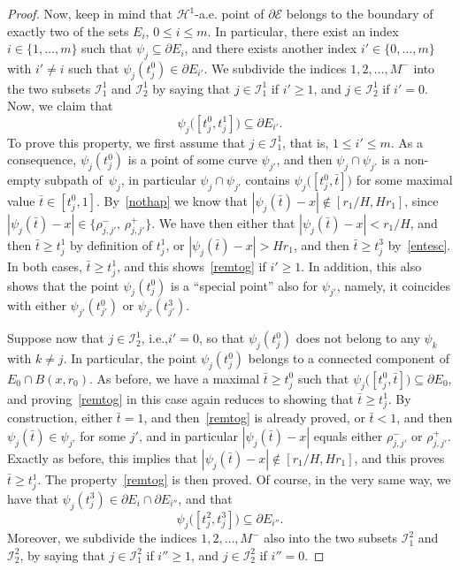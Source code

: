 \documentclass[11pt]{article}
\newcommand{\ie}{i.e.,\xspace}
\numberwithin{equation}{section}
\newcommand\E{\mathcal{E}}
\renewcommand\H{\mathcal{H}}
\newcommand\I{\mathcal{I}}
\theoremstyle{plain}
\theoremstyle{definition}
\begin{document}
\begin{proof}
Now, keep in mind that $\H^1$-a.e. point of $\partial\E$ belongs to the boundary of exactly two of the sets $E_i$, $0\leq i \leq m$. In particular, there exist an index $i\in\{1,\dots,m\}$ such that $\psi_j\subseteq \partial E_i$, and there exists another index $i'\in\{0,\dots,m\}$ with $i'\neq i$ such that $\psi_j(t^0_j)\in \partial E_{i'}$. We subdivide the indices $1,2,\dots, M^-$ into the two subsets $\I^1_1$ and $\I^1_2$ by saying that $j\in \I^1_1$ if $i'\geq 1$, and $j\in \I^1_2$ if $i'=0$. Now, we claim that
\begin{equation}\label{remtog}
\psi_j\big( [t^0_j , t^1_j]\big) \subseteq \partial E_{i'}.
\end{equation}
To prove this property, we first assume that $j\in\I^1_1$, that is, $1\leq i' \leq m$. As a con\-se\-quence, $\psi_j(t^0_j)$ is a point of some curve $\psi_{j'}$, and then $\psi_j \cap \psi_{j'}$ is a non-empty subpath of~$\psi_j$, in particular $\psi_j\cap\psi_{j'}$ contains $\psi_j\big( [t^0_j,\bar t] \big)$ for some maximal value $\bar t\in[t^0_j,1]$. By~\eqref{nothap} we know that $|\psi_j(\bar t)-x|\notin [r_1/H,Hr_1]$, since $|\psi_j(\bar t)-x| \in \{\rho^-_{j,j'},\,\rho^+_{j,j'}\}$. We have then either that $|\psi_j(\bar t)-x|<r_1/H$, and then $\bar t\geq t^1_j$ by definition of $t^1_j$, or $|\psi_j(\bar t)-x|>Hr_1$, and then $\bar t\geq t^3_j$ by~\eqref{entesc}. In both cases, $\bar t\geq t^1_j$, and this shows~\eqref{remtog} if $i'\geq 1$. In addition, this also shows that the point $\psi_j(t^0_j)$ is a ``special point'' also for $\psi_{j'}$, namely, it coincides with either $\psi_{j'}(t^0_{j'})$ or $\psi_{j'}(t^3_{j'})$.

Suppose now that $j\in \I^1_2$, \ie $i'=0$, so that $\psi_j(t^0_j)$ does not belong to any $\psi_k$ with $k\neq j$. In particular, the point $\psi_j(t^0_j)$ belongs to a connected component of $E_0\cap B(x,r_0)$. As before, we have a maximal $\bar t\geq t^0_j$ such that $\psi_j\big([t^0_j,\bar t]\big)\subseteq \partial E_0$, and proving~\eqref{remtog} in this case again reduces to showing that $\bar t\geq t^1_j$. By construction, either $\bar t=1$, and then~\eqref{remtog} is already proved, or $\bar t<1$, and then $\psi_j(\bar t)\in \psi_{j'}$ for some $j'$, and in particular $|\psi_j(\bar t)-x|$ equals either $\rho^-_{j,j'}$ or $\rho^+_{j,j'}$. Exactly as before, this implies that $|\psi_j(\bar t)-x|\notin [r_1/H,Hr_1]$, and this proves $\bar t\geq t^1_j$. The property~\eqref{remtog} is then proved. Of course, in the very same way, we have that $\psi_j(t^3_j)\in \partial E_i \cap \partial E_{i''}$, and that
\begin{equation}\label{remtog2}
\psi_j\big( [t^2_j , t^3_j]\big) \subseteq \partial E_{i''}.
\end{equation}
Moreover, we subdivide the indices $1,2,\dots, M^-$ also into the two subsets $\I^2_1$ and $\I^2_2$, by saying that $j\in \I^2_1$ if $i''\geq 1$, and $j \in \I^2_2$ if $i''=0$.


\end{proof}
\end{document}
